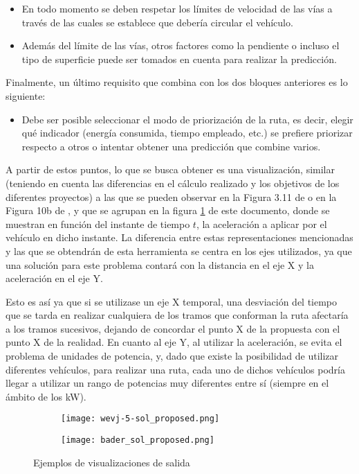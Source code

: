 \documentclass[11pt,spanish,listoffigures,listoftables]{tfgetsinf}
\begin{document}
\begin{itemize}
    \item En todo momento se deben respetar los límites de velocidad de las vías a través de las cuales se establece que debería circular el vehículo.
    \item Además del límite de las vías, otros factores como la pendiente o incluso el tipo de superficie puede ser tomados en cuenta para realizar la predicción.
\end{itemize}

Finalmente, un último requisito que combina con los dos bloques anteriores es lo siguiente:

\begin{itemize}
    \item Debe ser posible seleccionar el modo de priorización de la ruta, es decir, elegir qué indicador (energía consumida, tiempo empleado, etc.) se prefiere priorizar respecto a otros o intentar obtener una predicción que combine varios.
\end{itemize}

A partir de estos puntos, lo que se busca obtener es una visualización, similar (teniendo en cuenta las diferencias en el cálculo realizado y los objetivos de los diferentes proyectos) a las que se pueden observar en la Figura 3.11 de \cite{Bader13} o en la Figura 10b de \cite{EVS26}, y que se agrupan en la figura \ref{fig:other_solutions} de este documento, donde se muestran en función del instante de tiempo $t$, la aceleración a aplicar por el vehículo en dicho instante. La diferencia entre estas representaciones mencionadas y las que se obtendrán de esta herramienta se centra en los ejes utilizados, ya que una solución para este problema contará con la distancia en el eje X y la aceleración en el eje Y.

Esto es así ya que si se utilizase un eje X temporal, una desviación del tiempo que se tarda en realizar cualquiera de los tramos que conforman la ruta afectaría a los tramos sucesivos, dejando de concordar el punto X de la propuesta con el punto X de la realidad. En cuanto al eje Y, al utilizar la aceleración, se evita el problema de unidades de potencia, y, dado que existe la posibilidad de utilizar diferentes vehículos, para realizar una ruta, cada uno de dichos vehículos podría llegar a utilizar un rango de potencias muy diferentes entre sí (siempre en el ámbito de los kW).

\begin{figure}[!htb]
    \centering
    \begin{subfigure}[b]{0.95\linewidth}
    \texttt{[image: wevj-5-sol\_proposed.png]}
    \end{subfigure}
    \begin{subfigure}[b]{0.95\linewidth}
    \texttt{[image: bader\_sol\_proposed.png]}
    \end{subfigure}
    \caption{Ejemplos de visualizaciones de salida}
    \label{fig:other_solutions}
\end{figure}
\end{document}
